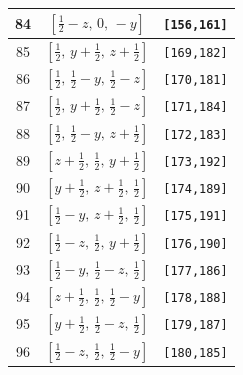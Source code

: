 \documentclass[fleqn,8pt]{jsarticle}
\begin{document}
\begin{longtable}{ccc}
84 & $\left[ \frac{1}{2} - z,\, 0,\, - y \right]$ & {\tt [156,161]} \\ \hline
85 & $\left[ \frac{1}{2},\, y + \frac{1}{2},\, z + \frac{1}{2} \right]$ & {\tt [169,182]} \\ \hline
86 & $\left[ \frac{1}{2},\, \frac{1}{2} - y,\, \frac{1}{2} - z \right]$ & {\tt [170,181]} \\ \hline
87 & $\left[ \frac{1}{2},\, y + \frac{1}{2},\, \frac{1}{2} - z \right]$ & {\tt [171,184]} \\ \hline
88 & $\left[ \frac{1}{2},\, \frac{1}{2} - y,\, z + \frac{1}{2} \right]$ & {\tt [172,183]} \\ \hline
89 & $\left[ z + \frac{1}{2},\, \frac{1}{2},\, y + \frac{1}{2} \right]$ & {\tt [173,192]} \\ \hline
90 & $\left[ y + \frac{1}{2},\, z + \frac{1}{2},\, \frac{1}{2} \right]$ & {\tt [174,189]} \\ \hline
91 & $\left[ \frac{1}{2} - y,\, z + \frac{1}{2},\, \frac{1}{2} \right]$ & {\tt [175,191]} \\ \hline
92 & $\left[ \frac{1}{2} - z,\, \frac{1}{2},\, y + \frac{1}{2} \right]$ & {\tt [176,190]} \\ \hline
93 & $\left[ \frac{1}{2} - y,\, \frac{1}{2} - z,\, \frac{1}{2} \right]$ & {\tt [177,186]} \\ \hline
94 & $\left[ z + \frac{1}{2},\, \frac{1}{2},\, \frac{1}{2} - y \right]$ & {\tt [178,188]} \\ \hline
95 & $\left[ y + \frac{1}{2},\, \frac{1}{2} - z,\, \frac{1}{2} \right]$ & {\tt [179,187]} \\ \hline
96 & $\left[ \frac{1}{2} - z,\, \frac{1}{2},\, \frac{1}{2} - y \right]$ & {\tt [180,185]} \\
\end{longtable}
\renewcommand{\arraystretch}{1.2}
\end{document}
